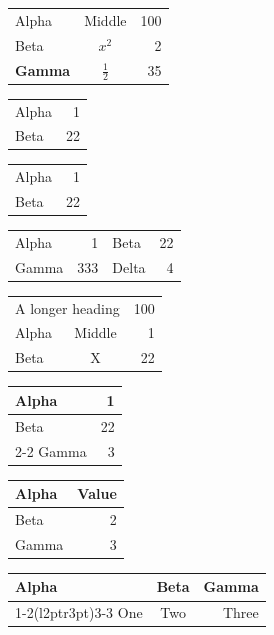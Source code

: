 \documentclass[aspectratio=169]{beamer}
\begin{document}
\begin{frame}[plain,t]
\begin{tabular}{lcr}
Alpha & Middle & 100\\
Beta & $x^2$ & 2\\
\textbf{Gamma} & $\frac12$ & 35
\end{tabular}
\end{frame}
\begin{frame}[plain,t]
\begin{tabular}{@{}lr@{}}
Alpha & 1\\ Beta & 22
\end{tabular}
\end{frame}
\begin{frame}[plain,t]
\begin{tabular}{l@{ : }r}
Alpha & 1\\ Beta & 22
\end{tabular}
\end{frame}
\begin{frame}[plain,t]
\begin{tabular}{*{2}{lr}}
Alpha & 1 & Beta & 22\\ Gamma & 333 & Delta & 4
\end{tabular}
\end{frame}
\begin{frame}[plain,t]
\begin{tabular}{lcr}
\multicolumn{2}{c}{A longer heading} & 100\\
Alpha & Middle & 1\\ Beta & X & 22
\end{tabular}
\end{frame}
\begin{frame}[plain,t]
\begin{tabular}{|l|r|}
\hline Alpha & 1\\ \hline Beta & 22\\ \cline{2-2} Gamma & 3\\ \hline
\end{tabular}
\end{frame}
\begin{frame}[plain,t]
\begin{tabular}{@{}lr@{}}
\toprule Alpha & Value\\ \midrule Beta & 2\\ Gamma & 3\\ \bottomrule
\end{tabular}
\end{frame}
\begin{frame}[plain,t]
\begin{tabular}{lcr}
\toprule Alpha & Beta & Gamma\\
\cmidrule(lr){1-2}\cmidrule(l{2pt}r{3pt}){3-3}
One & Two & Three\\ \bottomrule
\end{tabular}
\end{frame}
\end{document}
